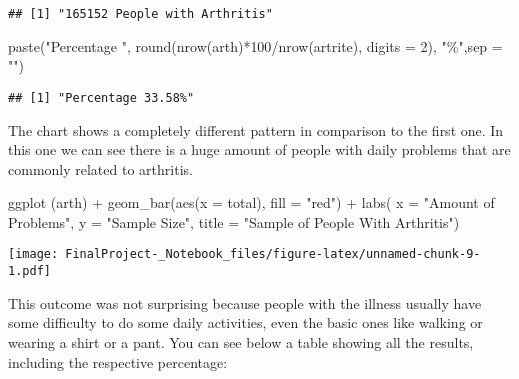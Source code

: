 \documentclass[
]{article}
\newenvironment{Shaded}{\begin{snugshade}}{\end{snugshade}}
\newcommand{\AttributeTok}[1]{\textcolor[rgb]{0.77,0.63,0.00}{#1}}
\newcommand{\DecValTok}[1]{\textcolor[rgb]{0.00,0.00,0.81}{#1}}
\newcommand{\FunctionTok}[1]{\textcolor[rgb]{0.00,0.00,0.00}{#1}}
\newcommand{\NormalTok}[1]{#1}
\newcommand{\SpecialCharTok}[1]{\textcolor[rgb]{0.00,0.00,0.00}{#1}}
\newcommand{\StringTok}[1]{\textcolor[rgb]{0.31,0.60,0.02}{#1}}
\begin{document}
\begin{verbatim}
## [1] "165152 People with Arthritis"
\end{verbatim}

\begin{Shaded}
\begin{Highlighting}[]
\FunctionTok{paste}\NormalTok{(}\StringTok{"Percentage "}\NormalTok{, }\FunctionTok{round}\NormalTok{(}\FunctionTok{nrow}\NormalTok{(arth)}\SpecialCharTok{*}\DecValTok{100}\SpecialCharTok{/}\FunctionTok{nrow}\NormalTok{(artrite), }\AttributeTok{digits =} \DecValTok{2}\NormalTok{), }\StringTok{"\%"}\NormalTok{,}\AttributeTok{sep =} \StringTok{""}\NormalTok{)}
\end{Highlighting}
\end{Shaded}

\begin{verbatim}
## [1] "Percentage 33.58%"
\end{verbatim}

The chart shows a completely different pattern in comparison to the
first one. In this one we can see there is a huge amount of people with
daily problems that are commonly related to arthritis.

\begin{Shaded}
\begin{Highlighting}[]
\FunctionTok{ggplot}\NormalTok{ (arth) }\SpecialCharTok{+}
  \FunctionTok{geom\_bar}\NormalTok{(}\FunctionTok{aes}\NormalTok{(}\AttributeTok{x =}\NormalTok{ total), }\AttributeTok{fill =} \StringTok{"red"}\NormalTok{) }\SpecialCharTok{+}
  \FunctionTok{labs}\NormalTok{( }\AttributeTok{x =} \StringTok{"Amount of Problems"}\NormalTok{,}
        \AttributeTok{y =} \StringTok{"Sample Size"}\NormalTok{,}
        \AttributeTok{title =} \StringTok{"Sample of People With Arthritis"}\NormalTok{) }
\end{Highlighting}
\end{Shaded}

\texttt{[image: FinalProject-\_Notebook\_files/figure-latex/unnamed-chunk-9-1.pdf]}

This outcome was not surprising because people with the illness usually
have some difficulty to do some daily activities, even the basic ones
like walking or wearing a shirt or a pant. You can see below a table
showing all the results, including the respective percentage:
\end{document}
